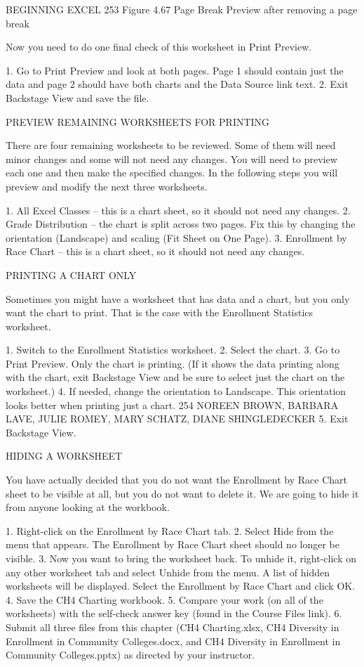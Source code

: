 BEGINNING EXCEL 253
Figure 4.67 Page Break Preview after removing a page break


Now you need to do one final check of this worksheet in Print Preview.

1. Go to Print Preview and look at both pages. Page 1 should contain just the data and page 2
should have both charts and the Data Source link text.
2. Exit Backstage View and save the file.

PREVIEW REMAINING WORKSHEETS FOR PRINTING

There are four remaining worksheets to be reviewed. Some of them will need minor changes and
some will not need any changes. You will need to preview each one and then make the specified
changes. In the following steps you will preview and modify the next three worksheets.

1. All Excel Classes – this is a chart sheet, so it should not need any changes.
2. Grade Distribution – the chart is split across two pages. Fix this by changing the orientation
(Landscape) and scaling (Fit Sheet on One Page).
3. Enrollment by Race Chart – this is a chart sheet, so it should not need any changes.

PRINTING A CHART ONLY

Sometimes you might have a worksheet that has data and a chart, but you only want the chart to print.
That is the case with the Enrollment Statistics worksheet.

1. Switch to the Enrollment Statistics worksheet.
2. Select the chart.
3. Go to Print Preview. Only the chart is printing. (If it shows the data printing along with the chart,
exit Backstage View and be sure to select just the chart on the worksheet.)
4. If needed, change the orientation to Landscape. This orientation looks better when printing just
a chart.
254 NOREEN BROWN, BARBARA LAVE, JULIE ROMEY, MARY SCHATZ, DIANE SHINGLEDECKER
5. Exit Backstage View.

HIDING A WORKSHEET

You have actually decided that you do not want the Enrollment by Race Chart sheet to be visible at
all, but you do not want to delete it. We are going to hide it from anyone looking at the workbook.

1. Right-click on the Enrollment by Race Chart tab.
2. Select Hide from the menu that appears. The Enrollment by Race Chart sheet should no longer
be visible.
3. Now you want to bring the worksheet back. To unhide it, right-click on any other worksheet
tab and select Unhide from the menu. A list of hidden worksheets will be displayed. Select the
Enrollment by Race Chart and click OK.
4. Save the CH4 Charting workbook.
5. Compare your work (on all of the worksheets) with the self-check answer key (found in the
Course Files link).
6. Submit all three files from this chapter (CH4 Charting.xlsx, CH4 Diversity in Enrollment in
Community Colleges.docx, and CH4 Diversity in Enrollment in Community
Colleges.pptx) as directed by your instructor.



